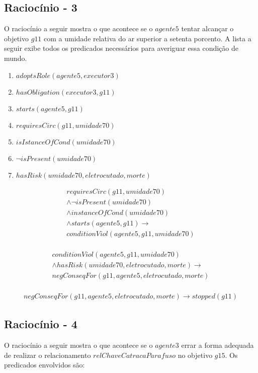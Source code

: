 \subsection{Raciocínio - 3} 
\label{raciocinio3}

O raciocínio a seguir mostra o que acontece se o $agente5$ tentar alcançar o objetivo $g11$ com a umidade relativa do ar superior a setenta porcento. A lista a seguir exibe todos os predicados necessários para averiguar essa condição de mundo. 

\begin{enumerate}
	\item $adoptsRole(agente5,executor3)$
	\item $hasObligation(executor3,g11)$	
	\item $starts(agente5,g11)$ 
	\item $requiresCirc(g11,umidade70)$
	\item $isIstanceOfCond(umidade70)$
	\item $\neg isPresent(umidade70)$
	\item $hasRisk(umidade70,eletrocutado,morte)$
\end{enumerate}

\begin{eqnarray}
	requiresCirc(g11,umidade70) \\ \nonumber
	\wedge \neg isPresent(umidade70) \\ \nonumber
	\wedge instanceOfCond(umidade70) \\ \nonumber
	\wedge starts(agente5,g11)  \to \\ \nonumber   
	conditionViol(agente5,g11,umidade70) \nonumber \\	
\end{eqnarray}

\begin{eqnarray} \nonumber
	conditionViol(agente5,g11,umidade70) \nonumber \\
	 \wedge hasRisk(umidade70,eletrocutado,morte) \to \nonumber \\ 
	negConseqFor(g11,agente5,eletrocutado,morte) \nonumber \\ 	
\end{eqnarray}

\begin{eqnarray}
	negConseqFor(g11,agente5,eletrocutado,morte) \to stopped(g11)
\end{eqnarray}

\subsection{Raciocínio - 4} 
\label{raciocinio4}
O raciocínio a seguir mostra o que acontece se o $agente3$ errar a forma adequada de realizar o relacionamento $relChaveCatracaParafuso$ no objetivo $g15$. Os predicados envolvidos são:

